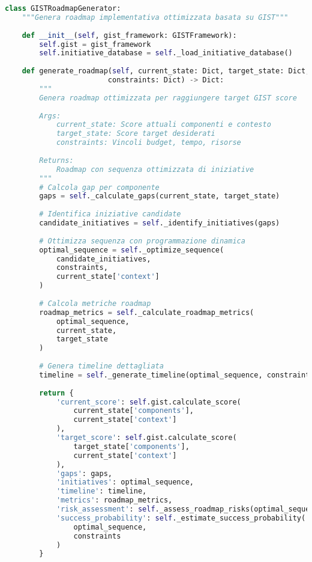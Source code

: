 \begin{lstlisting}[language=Python, caption=Generazione Roadmap Ottimizzata GIST]
class GISTRoadmapGenerator:
    """Genera roadmap implementativa ottimizzata basata su GIST"""
    
    def __init__(self, gist_framework: GISTFramework):
        self.gist = gist_framework
        self.initiative_database = self._load_initiative_database()
        
    def generate_roadmap(self, current_state: Dict, target_state: Dict,
                        constraints: Dict) -> Dict:
        """
        Genera roadmap ottimizzata per raggiungere target GIST score
        
        Args:
            current_state: Score attuali componenti e contesto
            target_state: Score target desiderati
            constraints: Vincoli budget, tempo, risorse
            
        Returns:
            Roadmap con sequenza ottimizzata di iniziative
        """
        # Calcola gap per componente
        gaps = self._calculate_gaps(current_state, target_state)
        
        # Identifica iniziative candidate
        candidate_initiatives = self._identify_initiatives(gaps)
        
        # Ottimizza sequenza con programmazione dinamica
        optimal_sequence = self._optimize_sequence(
            candidate_initiatives,
            constraints,
            current_state['context']
        )
        
        # Calcola metriche roadmap
        roadmap_metrics = self._calculate_roadmap_metrics(
            optimal_sequence,
            current_state,
            target_state
        )
        
        # Genera timeline dettagliata
        timeline = self._generate_timeline(optimal_sequence, constraints)
        
        return {
            'current_score': self.gist.calculate_score(
                current_state['components'], 
                current_state['context']
            ),
            'target_score': self.gist.calculate_score(
                target_state['components'],
                current_state['context']
            ),
            'gaps': gaps,
            'initiatives': optimal_sequence,
            'timeline': timeline,
            'metrics': roadmap_metrics,
            'risk_assessment': self._assess_roadmap_risks(optimal_sequence),
            'success_probability': self._estimate_success_probability(
                optimal_sequence, 
                constraints
            )
        }
    

\end{lstlisting}
